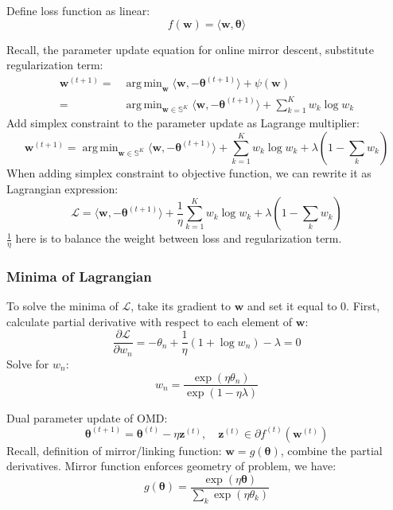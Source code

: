 \documentclass[11pt]{article}
\DeclareMathOperator*{\argmin}{arg\,min}
\begin{document}
Define loss function as linear:
\[ f(\boldsymbol{w}) = \langle \boldsymbol{w}, \boldsymbol{\theta} \rangle \]

Recall, the parameter update equation for online mirror descent, substitute regularization term:
\begin{align}
    \boldsymbol{w}^{(t+1)} = & \argmin_{\boldsymbol{w}} \langle \boldsymbol{w}, -\boldsymbol{\theta}^{(t+1)} \rangle + \psi (\boldsymbol{w})\nonumber \\
    = & \argmin_{\boldsymbol{w} \in \mathbb{S}^K} \langle \boldsymbol{w}, -\boldsymbol{\theta}^{(t+1)} \rangle + \sum_{k=1}^{K} w_k \log w_k \nonumber
\end{align}
Add simplex constraint to the parameter update as Lagrange multiplier:
\[ \boldsymbol{w}^{(t+1)} = \argmin_{\boldsymbol{w} \in \mathbb{S}^K} \langle \boldsymbol{w}, -\boldsymbol{\theta}^{(t+1)} \rangle + \sum_{k=1}^{K} w_k \log w_k + \lambda \left( 1- \sum_k w_k \right) \]
When adding simplex constraint to objective function, we can rewrite it as Lagrangian expression:
\[ \mathcal{L} = \langle \boldsymbol{w}, -\boldsymbol{\theta}^{(t+1)} \rangle + \frac{1}{\eta}\sum_{k=1}^{K} w_k \log w_k + \lambda \left( 1- \sum_k w_k \right) \]
$\frac{1}{\eta}$ here is to balance the weight between loss and regularization term. \\

\subsubsection{Minima of Lagrangian}
To solve the minima of $ \mathcal{L} $, take its gradient to $\boldsymbol{w}$ and set it equal to 0. First, calculate partial derivative with respect to each element of $\boldsymbol{w}$:
\[ \frac{\partial \mathcal{L}}{\partial w_n} = -\theta_n + \frac{1}{\eta} (1 + \log w_n) - \lambda = 0 \]
Solve for $w_n$:
\[ w_n = \frac{\exp (\eta \theta_n)}{\exp (1 - \eta\lambda)} \]

Dual parameter update of OMD:
\[ \boldsymbol{\theta}^{(t+1)} = \boldsymbol{\theta}^{(t)} - \eta\boldsymbol{z}^{(t)}, \quad \boldsymbol{z}^{(t)} \in \partial f^{(t)}(\boldsymbol{w}^{(t)}) \]
Recall, definition of mirror/linking function: $\boldsymbol{w} = g(\boldsymbol{\theta})$, combine the partial derivatives. Mirror function enforces geometry of problem, we have:  %
\[ g(\boldsymbol{\theta}) = \frac{\exp (\eta \boldsymbol\theta)}{\sum_k\exp(\eta\theta_k)} \]
\end{document}
